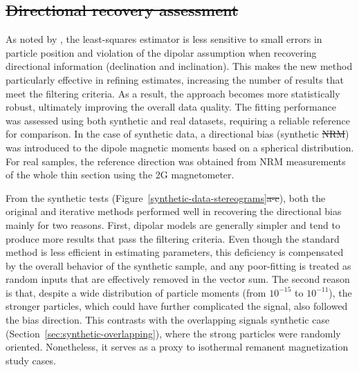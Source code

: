 \documentclass[onecolumn,12pt,a4paper]{article}
\providecommand{\DIFaddtex}[1]{{\protect\color{blue}\uwave{#1}}} %
\providecommand{\DIFdeltex}[1]{{\protect\color{red}\sout{#1}}}                      %
\providecommand{\DIFaddbegin}{} %
\providecommand{\DIFaddend}{} %
\providecommand{\DIFdelbegin}{} %
\providecommand{\DIFdelend}{} %
\providecommand{\DIFadd}[1]{\texorpdfstring{\DIFaddtex{#1}}{#1}} %
\providecommand{\DIFdel}[1]{\texorpdfstring{\DIFdeltex{#1}}{}} %
\newcommand{\DIFscaledelfig}{0.5}
\newlength{\DIFdelgraphicswidth} %
\newlength{\DIFdelgraphicsheight} %
\newcommand{\DIFaddincludegraphics}[2][]{{\color{blue}\fbox{\DIFOincludegraphics[#1]{#2}}}} %
\newcommand{\DIFdelincludegraphics}[2][]{%
\sbox{\DIFdelgraphicsbox}{\DIFOincludegraphics[#1]{#2}}%
\settoboxwidth{\DIFdelgraphicswidth}{\DIFdelgraphicsbox} %
\settoboxtotalheight{\DIFdelgraphicsheight}{\DIFdelgraphicsbox} %
\scalebox{\DIFscaledelfig}{%
\parbox[b]{\DIFdelgraphicswidth}{\usebox{\DIFdelgraphicsbox}\\[-\baselineskip] \rule{\DIFdelgraphicswidth}{0em}}\llap{\resizebox{\DIFdelgraphicswidth}{\DIFdelgraphicsheight}{%
\setlength{\unitlength}{\DIFdelgraphicswidth}%
\begin{picture}(1,1)%
\thicklines\linethickness{2pt} %
{\color[rgb]{1,0,0}\put(0,0){\framebox(1,1){}}}%
{\color[rgb]{1,0,0}\put(0,0){\line( 1,1){1}}}%
{\color[rgb]{1,0,0}\put(0,1){\line(1,-1){1}}}%
\end{picture}%
}\hspace*{3pt}}} %
} %
\DeclareRobustCommand{\DIFaddbegin}{\DIFOaddbegin \let\includegraphics\DIFaddincludegraphics} %
\DeclareRobustCommand{\DIFaddend}{\DIFOaddend \let\includegraphics\DIFOincludegraphics} %
\DeclareRobustCommand{\DIFdelbegin}{\DIFOdelbegin \let\includegraphics\DIFdelincludegraphics} %
\DeclareRobustCommand{\DIFdelend}{\DIFOaddend \let\includegraphics\DIFOincludegraphics} %
\begin{document}
\DIFdelbegin \subsection{\DIFdel{Directional recovery assessment}}
\addtocounter{subsection}{-1}%

\DIFdelend As noted by \citet{Oliveira2015Estimation}, the least-squares estimator is less sensitive to small errors in particle position and violation of the dipolar assumption when recovering directional information (declination and inclination). This makes the new method particularly effective in refining estimates, increasing the number of results that meet the filtering criteria. As a result, the approach becomes more statistically robust, ultimately improving the overall data quality. The fitting performance was assessed using both synthetic and real datasets, requiring a reliable reference for comparison. In the case of synthetic data, a directional bias (synthetic \DIFdelbegin \DIFdel{NRM}\DIFdelend \DIFaddbegin \DIFadd{IRM}\DIFaddend ) was introduced to the dipole magnetic moments based on a spherical distribution. For real samples, the reference direction was obtained from NRM measurements of the whole thin section using the 2G magnetometer.

From the synthetic tests (Figure~\ref{synthetic-data-stereograms}\DIFdelbegin \DIFdel{a-c}\DIFdelend ), both the original \citep{Souza-Junior2024} and iterative methods performed well in recovering the directional bias mainly for two reasons. First, dipolar models are generally simpler and tend to produce more results that pass the filtering criteria. Even though the standard method is less efficient in estimating parameters, this deficiency is compensated by the overall behavior of the synthetic sample, and any poor-fitting is treated as random inputs that are effectively removed in the vector sum. The second reason is that, despite a wide distribution of particle moments (from \(10^{-15}\) to \(10^{-11}\)), the stronger particles, which could have further complicated the signal, also followed the bias direction. This contrasts with the overlapping signals synthetic case (Section~\ref{sec:synthetic-overlapping}), where the strong particles were randomly oriented. Nonetheless, it serves as a proxy to isothermal remanent magnetization study cases.
\end{document}
